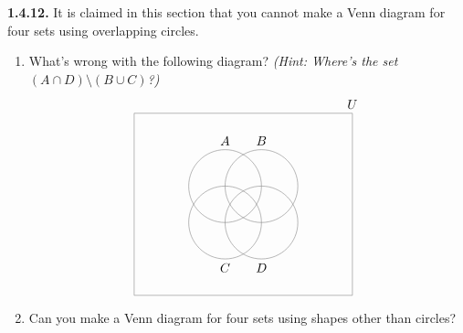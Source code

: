\documentclass[12pt]{amsart}
\newenvironment{statement}[1]{\smallskip\noindent\color[rgb]{.6627, .3529, .6314} {\bf #1.}}{}
\theoremstyle{definition}
\theoremstyle{remark}
\begin{document}
\begin{statement}{1.4.12}
It is claimed in this section that you cannot make a Venn diagram for four sets using overlapping circles.
\begin{enumerate}
	\item What's wrong with the following diagram?
	\emph{(Hint: Where's the set $(A \cap D) \setminus (B \cup C)$?)}
	\begin{equation*}
		\begin{tikzpicture}
			\draw[gray]
				(0, 0.5) circle (1) 
				(0, 1.5)  node [text = black, above] {$A$}
				(1, 0.5) circle (1) 
				(1, 1.5)  node [text = black, above] {$B$}
				(0, -0.5) circle (1) 
				(0, -1.5)  node [text = black, below] {$C$}
				(1, -0.5) circle (1) 
				(1, -1.5)  node [text = black, below] {$D$}
				(-2.5, -2.5) rectangle 
				(3.5, 2.5) node [text = black, above] {$U$};
		\end{tikzpicture}
	\end{equation*}
	
	\item Can you make a Venn diagram for four sets using shapes other than circles?
\end{enumerate}
\end{statement}
\end{document}
